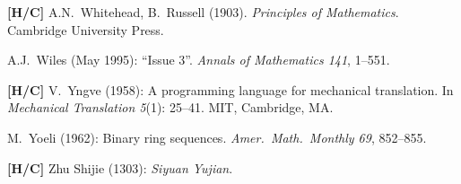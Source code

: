 \begin{thebibliography}{999}
{\bf [H/C]}
A.N.~Whitehead, B.~Russell (1903).  {\it Principles of Mathematics}. Cambridge University Press. 

A.J.~Wiles (May 1995): ``Issue 3''.  {\it Annals of Mathematics 141}, 1--551.



{\bf [H/C]}
V.~Yngve (1958):  A programming language for mechanical translation.
In {\it Mechanical Translation 5}(1): 25--41.  MIT, Cambridge, MA.

M.~Yoeli (1962): Binary ring sequences.  {\it Amer.~Math.~Monthly 69}, 852--855.


{\bf [H/C]}
Zhu Shijie (1303): {\it Siyuan Yujian}.


\end{thebibliography}

